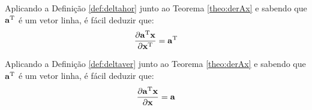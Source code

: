 \newpage
\begin{corollary}\label{coro:derAx3}
Aplicando a Definição \ref{def:deltahor} junto ao Teorema \ref{theo:derAx} e sabendo que $\VECTOR{a}^{\transpose}$
é um vetor linha, é
fácil deduzir que:
\begin{equation}
\frac{\partial \VECTOR{a}^{\transpose}\VECTOR{x}}{\partial \VECTOR{x}^{\transpose}}=\VECTOR{a}^{\transpose}
\end{equation}
\end{corollary}

\begin{corollary}\label{coro:derAx4}
Aplicando a Definição \ref{def:deltaver} junto ao Teorema \ref{theo:derAx} e sabendo que $\VECTOR{a}^{\transpose}$
é um vetor linha, é
fácil deduzir que:
\begin{equation}
\frac{\partial \VECTOR{a}^{\transpose}\VECTOR{x}}{\partial \VECTOR{x}}=\VECTOR{a}
\end{equation}
\end{corollary}
